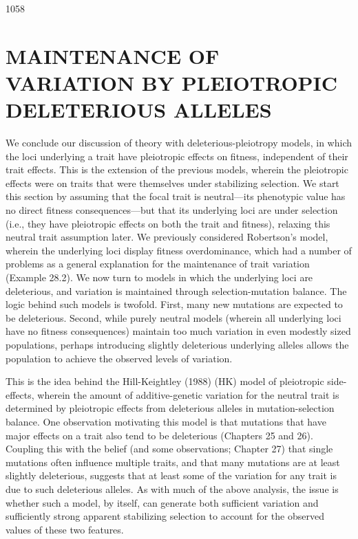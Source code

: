 \documentclass{article}
\begin{document}
1058

\section{MAINTENANCE OF VARIATION BY PLEIOTROPIC DELETERIOUS ALLELES}
We conclude our discussion of theory with deleterious-pleiotropy models, in which the loci underlying a trait have pleiotropic effects on fitness, independent of their trait effects. This is the extension of the previous models, wherein the pleiotropic effects were on traits that were themselves under stabilizing selection. We start this section by assuming that the focal trait is neutral—its phenotypic value has no direct fitness consequences—but that its underlying loci are under selection (i.e., they have pleiotropic effects on both the trait and fitness), relaxing this neutral trait assumption later. We previously considered Robertson's model, wherein the underlying loci display fitness overdominance, which had a number of problems as a general explanation for the maintenance of trait variation (Example 28.2). We now turn to models in which the underlying loci are deleterious, and variation is maintained through selection-mutation balance. The logic behind such models is twofold. First, many new mutations are expected to be deleterious. Second, while purely neutral models (wherein all underlying loci have no fitness consequences) maintain too much variation in even modestly sized populations, perhaps introducing slightly deleterious underlying alleles allows the population to achieve the observed levels of variation.

This is the idea behind the Hill-Keightley (1988) (HK) model of pleiotropic side-effects, wherein the amount of additive-genetic variation for the neutral trait is determined by pleiotropic effects from deleterious alleles in mutation-selection balance. One observation motivating this model is that mutations that have major effects on a trait also tend to be deleterious (Chapters 25 and 26). Coupling this with the belief (and some observations; Chapter 27) that single mutations often influence multiple traits, and that many mutations are at least slightly deleterious, suggests that at least some of the variation for any trait is due to such deleterious alleles. As with much of the above analysis, the issue is whether such a model, by itself, can generate both sufficient variation and sufficiently strong apparent stabilizing selection to account for the observed values of these two features.
\end{document}
